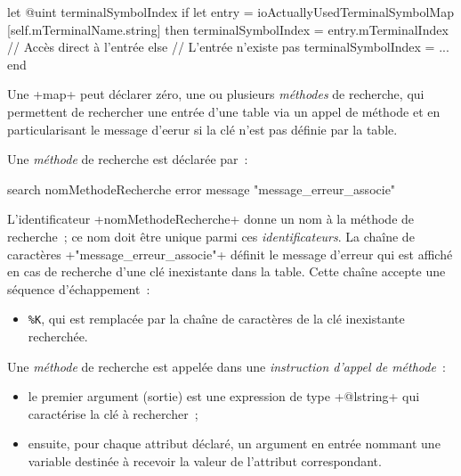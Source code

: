 \begin{galgas4}
let @uint terminalSymbolIndex
if let entry = ioActuallyUsedTerminalSymbolMap [self.mTerminalName.string] then
  terminalSymbolIndex = entry.mTerminalIndex // Accès direct à l'entrée
else // L'entrée n'existe pas
  terminalSymbolIndex = ...
end
\end{galgas4}









Une \ggst+map+ peut déclarer zéro, une ou plusieurs \emph{méthodes} de recherche, qui permettent de rechercher une entrée d'une table via un appel de méthode et en particularisant le message d'eerur si la clé n'est pas définie par la table. 


Une \emph{méthode} de recherche est déclarée par~:


\begin{galgas3}
search nomMethodeRecherche error message "message_erreur_associe"
\end{galgas3}

\begin{galgas4}
\end{galgas4}

L'identificateur \ggst+nomMethodeRecherche+ donne un nom à la méthode de recherche~; ce nom doit être unique parmi ces \emph{identificateurs}. La chaîne de caractères \ggst+"message_erreur_associe"+ définit le message d'erreur qui est affiché en cas de recherche d'une clé inexistante dans la table. Cette chaîne accepte une séquence d'échappement~:
\begin{itemize}
  \item \texttt{\%K}, qui est remplacée par la chaîne de caractères de la clé inexistante recherchée.
\end{itemize}


Une \emph{méthode} de recherche est appelée dans une \emph{instruction d'appel de méthode}~:
\begin{itemize}
  \item le premier argument (sortie) est une expression de type \ggst+@lstring+ qui caractérise la clé à rechercher~;
  \item ensuite, pour chaque attribut déclaré, un argument en entrée nommant une variable destinée à recevoir la valeur de l'attribut correspondant.
\end{itemize}

